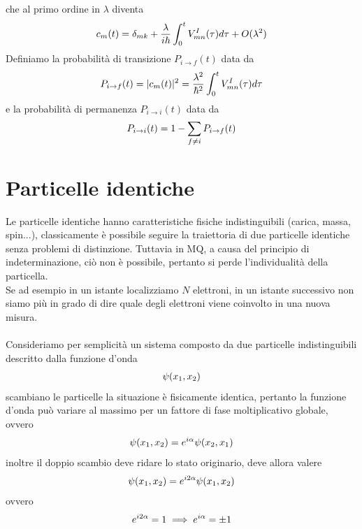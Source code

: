 \documentclass{article}
\begin{document}
che al primo ordine in $\lambda$ diventa
\begin{gather}
    c_m(t) = \delta_{mk} + \frac{\lambda}{i\hbar}\int_0^t V_{mn}^I(\tau)d\tau + O(\lambda^2) \notag
\end{gather}
Definiamo la probabilità di transizione $P_{i \rightarrow f}(t)$ data da
\begin{gather}
    P_{i \rightarrow f}(t) = |c_m(t)|^2 = \frac{\lambda^2}{\hbar^2}\int_0^t V_{mn}^I(\tau)d\tau \notag
\end{gather}
e la probabilità di permanenza $P_{i \rightarrow i}(t)$ data da
\begin{gather}
    P_{i \rightarrow i}(t) = 1 - \sum_{f \neq i}P_{i \rightarrow f}(t) \notag
\end{gather}

\newpage
\section{Particelle identiche}
Le particelle identiche hanno caratteristiche fisiche indistinguibili (carica, massa, spin...), classicamente è possibile seguire la traiettoria di due particelle identiche senza problemi di distinzione. Tuttavia in MQ, a causa del principio di indeterminazione, ciò non è possibile, pertanto si perde l'individualità della particella. \\
Se ad esempio in un istante localizziamo $N$ elettroni, in un istante successivo non siamo più in grado di dire quale degli elettroni viene coinvolto in una nuova misura. \\ \\
Consideriamo per semplicità un sistema composto da due particelle indistinguibili descritto dalla funzione d'onda
\begin{gather}
    \psi(x_1, x_2) \notag
\end{gather}
scambiano le particelle la situazione è fisicamente identica, pertanto la funzione d'onda può variare al massimo per un fattore di fase moltiplicativo globale, ovvero
\begin{gather}
    \psi(x_1, x_2) = e^{i\alpha}\psi(x_2, x_1) \notag
\end{gather}
inoltre il doppio scambio deve ridare lo stato originario, deve allora valere
\begin{gather}
    \psi(x_1, x_2) = e^{i2\alpha}\psi(x_1, x_2) \notag
\end{gather}
ovvero
\begin{gather}
    e^{i2\alpha} = 1 \implies e^{i\alpha} = \pm 1 \notag
\end{gather}
\end{document}
